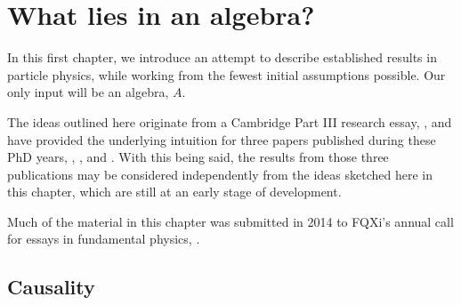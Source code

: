 \documentclass[letterpaper,12pt,titlepage,oneside,final]{book}
\begin{document}














\chapter{What lies in an algebra?\label{m1}  }



In this first chapter, we introduce an attempt to describe established results in particle physics, while working from the fewest initial assumptions possible.  Our only input will be an algebra, $A$.  

The ideas outlined here originate from a Cambridge Part III research essay, \cite{cm}, \cite{cmnotes} and have provided the underlying intuition for three papers published during these PhD years, \cite{qq}, \cite{Gen}, and \cite{UTI}.  With this being said, the results from those three publications may be considered independently from the ideas sketched here in this chapter, which are still at an early stage of development.

Much of the material in this chapter was submitted in 2014 to FQXi's annual call for essays in fundamental physics, \cite{fqxi}.




\section{Causality }
\end{document}
